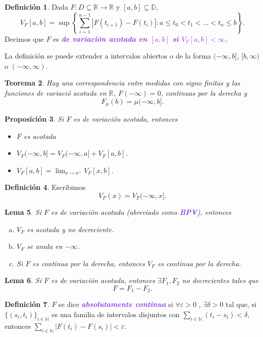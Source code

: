 \documentclass{article}
\newtheorem{theorem}{Teorema}[subsection]
\newtheorem{proposition}[theorem]{Proposición}
\newtheorem{lemma}[theorem]{Lema}
\theoremstyle{definition}
\newtheorem{definition}[theorem]{Definición}
\theoremstyle{remark}
\numberwithin{equation}{section}
\newcommand{\D}{\mathbb{D}}
\newcommand{\N}{\mathbb{N}}
\newcommand{\R}{\mathbb{R}}
\newcommand{\e}{\varepsilon}
\newcommand{\oo}{\infty}
\newcommand{\abs}[1]{\left| #1 \right|}
\newcommand{\set}[1]{\left\{ #1 \right\}}
\newcommand{\ds}{\displaystyle}
\newcommand{\wea}[1]{\textcolor{BlueViolet}{\textbf{\emph{#1}}}}
\begin{document}
\begin{definition}
  Dada $F \colon D \subseteq \R \to \R$ y $[a,b] \subseteq \D$,
  \[ V_F[a,b] = \sup\set{\sum_{i=1}^{n-1} \abs{F(t_{i+1}) - F(t_i)} : a \leq t_0 < t_1 < \dots < t_n \leq b}. \]
  Decimos que $F$ es \wea{de variación acotada en $[a,b]$ si $V_F[a,b] < \oo$.}
\end{definition}

La definición se puede extender a intervalos abiertos o de la forma $(-\oo,b]$, $[b,\oo)$ o $(-\oo,\oo)$.

\begin{theorem}
  Hay una correspondencia entre medidas con signo finitas y las funciones de variació acotada en $\R$, $F(-\oo) = 0$, continuas por la derecha y 
  \[ F_\mu(b) = \mu(-\oo,b]. \]
\end{theorem}

\begin{proposition}
  Si $F$ es de variación acotada, entonces
  \begin{itemize}
    \item $F$ es acotada
    \item $V_F(-\oo,b] = V_F(-\oo,a] + V_F[a,b]$.
    \item $\ds V_F[a,b] = \lim_{x\to a^+} V_F[x,b]$.
  \end{itemize}
\end{proposition}

\begin{definition}
  Escribimos
  \[ V_F(x) = V_F(-\oo,x]. \]
\end{definition}

\begin{lemma}
  Si $F$ es de variación acotada (abreviado como \wea{BPV}), entonces
  \begin{enumerate}[(a)]
    \item $V_F$ es acotada y no decreciente.
    \item $V_F$ se anula en $-\oo$.
    \item Si $F$ es continua por la derecha, entonces $V_F$ es continua por la derecha.
  \end{enumerate}
\end{lemma}

\begin{lemma}
  Si $F$ es de variación acotada, entonces $\exists F_1,F_2$ no decrecientes tales que
  \[ F = F_1 - F_2. \]
\end{lemma}

\begin{definition}
  $F$ se dice \wea{absolutamente continua} si $\forall \e>0$ , $\exists \delta>0$ tal que, si $\{(s_i,t_i)\}_{i\in\N}$ es una familia de intervalos disjuntos con $\sum_{i \in \N} (t_i - s_i) < \delta$, entonces $\sum_{i\in\N} \abs{F(t_i) - F(s_i)} < \e$.
\end{definition}
\end{document}
